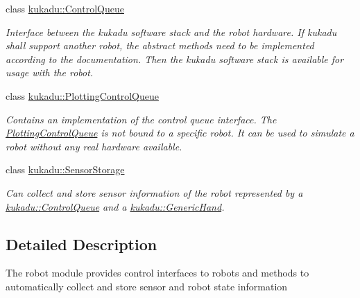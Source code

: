 \begin{DoxyCompactItemize}
class \hyperlink{classkukadu_1_1ControlQueue}{kukadu\+::\+Control\+Queue}
\begin{DoxyCompactList}\small\item\em Interface between the kukadu software stack and the robot hardware. If kukadu shall support another robot, the abstract methods need to be implemented according to the documentation. Then the kukadu software stack is available for usage with the robot. \end{DoxyCompactList}\item 
class \hyperlink{classkukadu_1_1PlottingControlQueue}{kukadu\+::\+Plotting\+Control\+Queue}
\begin{DoxyCompactList}\small\item\em Contains an implementation of the control queue interface. The \hyperlink{classkukadu_1_1PlottingControlQueue}{Plotting\+Control\+Queue} is not bound to a specific robot. It can be used to simulate a robot without any real hardware available. \end{DoxyCompactList}\item 
class \hyperlink{classkukadu_1_1SensorStorage}{kukadu\+::\+Sensor\+Storage}
\begin{DoxyCompactList}\small\item\em Can collect and store sensor information of the robot represented by a \hyperlink{classkukadu_1_1ControlQueue}{kukadu\+::\+Control\+Queue} and a \hyperlink{classkukadu_1_1GenericHand}{kukadu\+::\+Generic\+Hand}. \end{DoxyCompactList}\end{DoxyCompactItemize}


\subsection{Detailed Description}
The robot module provides control interfaces to robots and methods to automatically collect and store sensor and robot state information 
